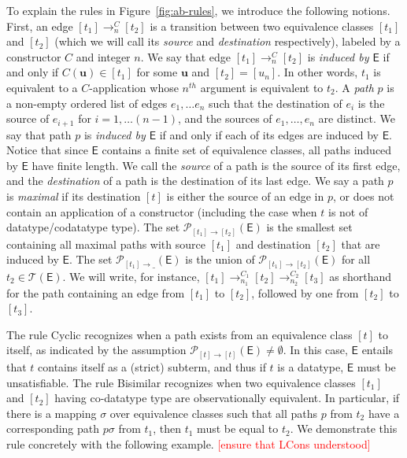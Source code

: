 \documentclass[a4paper,oribibl,envcountsame,draft]{llncs}
\newcommand\const[1]{\textsf{#1}}
\renewcommand{\vec}[1]{\boldsymbol{#1}}
\newcommand{\Ec}{\mathsf{E}}
\newcommand{\tEc}{\mathcal{T}(\Ec)}
\newcommand{\rn}[1]{\textsf{\small #1}}
\newcommand{\rem}[1]{\textcolor{red}{[#1]}}
\newcommand{\tpath}[2]{\mathcal{P}_{ #2 \rightarrow \_ }( #1 )}
\newcommand{\ttpath}[3]{\mathcal{P}_{ #2 \rightarrow #3 }( #1 )}
\newcommand{\ec}[1]{ [ #1 ] }
\begin{document}
To explain the rules in Figure~\ref{fig:ab-rules}, we introduce the following notions.
First, an edge $\ec{t_1} \rightarrow^{C}_n \ec{t_2}$ is a transition between two equivalence classes $\ec{t_1}$ and $\ec{t_2}$ 
(which we will call its \emph{source} and \emph{destination} respectively),
labeled by a constructor $C$ and integer $n$.
We say that edge $\ec{t_1} \rightarrow^{C}_n \ec{t_2}$ is \emph{induced by $\Ec$} if and only if $C( \vec u ) \in \ec{t_1}$ for some $\vec u$ and $\ec{t_2} = \ec{u_n}$.
In other words, $t_1$ is equivalent to a $C$-application whose $n^{th}$ argument is equivalent to $t_2$.
A \emph{path} $p$ is a non-empty ordered list of edges $e_1, \ldots e_n$ such that the destination of $e_i$ is the source of $e_{i+1}$ for $i = 1, \ldots (n-1)$,
and the sources of $e_1, \ldots, e_n$ are distinct.
We say that path $p$ is \emph{induced by $\Ec$} if and only if each of its edges are induced by $\Ec$.
Notice that since $\Ec$ contains a finite set of equivalence classes, all paths induced by $\Ec$ have finite length.
We call the \emph{source} of a path is the source of its first edge, and the \emph{destination} of a path is the destination of its last edge.
We say a path $p$ is \emph{maximal} if its destination $\ec{t}$ is either
the source of an edge in $p$, 
or does not contain an application of a constructor (including the case when $t$ is not of datatype/codatatype type).
The set $\ttpath{\Ec}{\ec{t_1}}{\ec{t_2}}$ is the smallest set containing all maximal paths with source $\ec{t_1}$ and destination $\ec{t_2}$ that are induced by $\Ec$.
The set $\tpath{\Ec}{\ec{t_1}}$ is the union of $\ttpath{\Ec}{\ec{t_1}}{\ec{t_2}}$ for all $t_2 \in \tEc$.
We will write, for instance, $\ec{t_1} \rightarrow^{C_1}_{n_1} \ec{t_2} \rightarrow^{C_2}_{n_2} \ec{t_3}$ 
as shorthand for the path containing an edge from $\ec{t_1}$ to $\ec{t_2}$, followed by one from $\ec{t_2}$ to $\ec{t_3}$.

The rule \rn{Cyclic} recognizes when a path exists from an equivalence class $\ec{t}$ to itself, as indicated
by the assumption $\ttpath{\Ec}{\ec{t}}{\ec{t}} \neq \emptyset$.
In this case, $\Ec$ entails that $t$ contains itself as a (strict) subterm,
and thus if $t$ is a datatype, $\Ec$ must be unsatisfiable.
The rule \rn{Bisimilar} recognizes when two equivalence classes $\ec{t_1}$ and $\ec{t_2}$ having co-datatype type are observationally equivalent.
In particular, if there is a mapping $\sigma$ over equivalence classes such that all paths $p$ from $t_2$
have a corresponding path $p \sigma$ from $t_1$,
then $t_1$ must be equal to $t_2$.
We demonstrate this rule concretely with the following example.
\rem{ensure that \const{LCons} understood}
\end{document}
